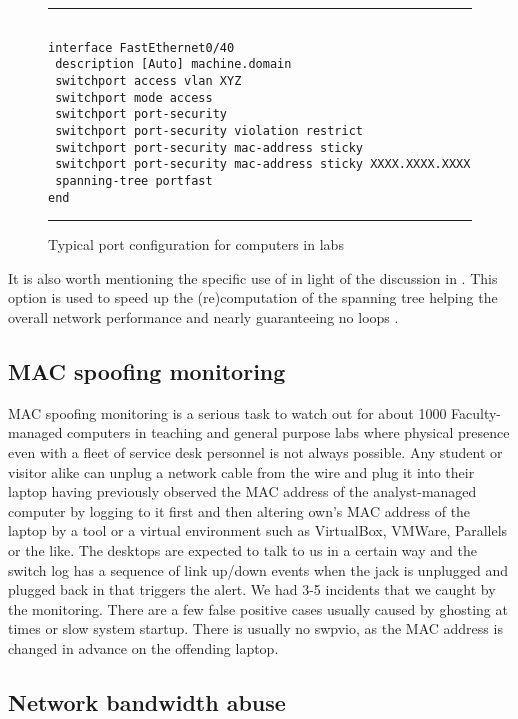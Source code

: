 \begin{figure}[htpb!]
\hrule
\begin{verbatim}

interface FastEthernet0/40
 description [Auto] machine.domain
 switchport access vlan XYZ
 switchport mode access
 switchport port-security
 switchport port-security violation restrict
 switchport port-security mac-address sticky
 switchport port-security mac-address sticky XXXX.XXXX.XXXX
 spanning-tree portfast
end
\end{verbatim}
\hrule
\normalsize
\caption{Typical port configuration for computers in labs}
\label{fig:typical-port-config}
\end{figure}

It is also worth mentioning the specific use of 
in light of the discussion in . This option
is used to speed up the (re)computation of the spanning tree helping
the overall network performance and nearly guaranteeing no loops \cite{cisco-kb-stp}.

\subsection{MAC spoofing monitoring}
\label{sect:mac-spoofing-mon}

MAC spoofing monitoring is a serious task to watch out for about
1000 Faculty-managed computers in teaching and general purpose labs
where physical presence even with a fleet of service desk personnel
is not always possible. Any student or visitor alike can unplug
a network cable from the wire and plug it into their laptop
having previously observed the MAC address of the analyst-managed
computer by logging to it first and then altering own's MAC address
of the laptop by a tool or a virtual environment such as VirtualBox, VMWare,
Parallels or the like. The desktops are expected to talk to us
in a certain way and the switch log has a sequence of link up/down
events when the jack is unplugged and plugged back in that
triggers the alert.
We had 3-5 incidents that we caught by the monitoring. There
are a few false positive cases usually caused by ghosting at
times or slow system startup. There is usually no swpvio, as
the MAC address is changed in advance on the offending laptop.


\subsection{Network bandwidth abuse}

